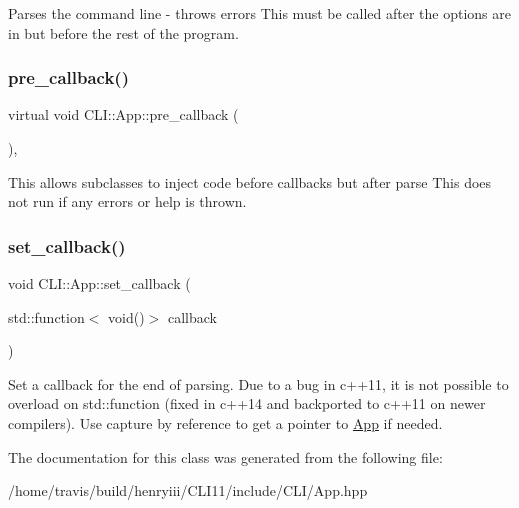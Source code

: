 Parses the command line -\/ throws errors This must be called after the options are in but before the rest of the program. \mbox{\label{class_c_l_i_1_1_app_a5d74be8e210e779874584a3336aaf506}} 
\subsubsection{\texorpdfstring{pre\+\_\+callback()}{pre\_callback()}}
{\footnotesize\ttfamily virtual void C\+L\+I\+::\+App\+::pre\+\_\+callback (\begin{DoxyParamCaption}{ }\end{DoxyParamCaption})\hspace{0.3cm}{\ttfamily [inline]}, {\ttfamily [virtual]}}

This allows subclasses to inject code before callbacks but after parse This does not run if any errors or help is thrown. \mbox{\label{class_c_l_i_1_1_app_a9a02c341de7711e71739a4b34a251b0e}} 
\subsubsection{\texorpdfstring{set\+\_\+callback()}{set\_callback()}}
{\footnotesize\ttfamily void C\+L\+I\+::\+App\+::set\+\_\+callback (\begin{DoxyParamCaption}\item[{std\+::function$<$ void()$>$}]{callback }\end{DoxyParamCaption})\hspace{0.3cm}{\ttfamily [inline]}}

Set a callback for the end of parsing. Due to a bug in c++11, it is not possible to overload on std\+::function (fixed in c++14 and backported to c++11 on newer compilers). Use capture by reference to get a pointer to \hyperlink{class_c_l_i_1_1_app}{App} if needed. 

The documentation for this class was generated from the following file\+:\begin{DoxyCompactItemize}
\item 
/home/travis/build/henryiii/\+C\+L\+I11/include/\+C\+L\+I/App.\+hpp\end{DoxyCompactItemize}

